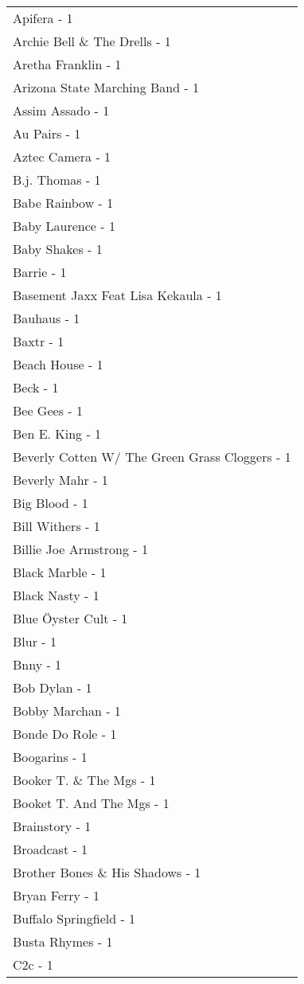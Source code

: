 \documentclass[
]{article}
\begin{document}
\begin{longtable}{l}
Apifera - 1 \\ 
Archie Bell \& The Drells - 1 \\ 
Aretha Franklin - 1 \\ 
Arizona State Marching Band - 1 \\ 
Assim Assado - 1 \\ 
Au Pairs - 1 \\ 
Aztec Camera - 1 \\ 
B.j. Thomas - 1 \\ 
Babe Rainbow - 1 \\ 
Baby Laurence - 1 \\ 
Baby Shakes - 1 \\ 
Barrie - 1 \\ 
Basement Jaxx Feat Lisa Kekaula - 1 \\ 
Bauhaus - 1 \\ 
Baxtr - 1 \\ 
Beach House - 1 \\ 
Beck - 1 \\ 
Bee Gees - 1 \\ 
Ben E. King - 1 \\ 
Beverly Cotten W/ The Green Grass Cloggers - 1 \\ 
Beverly Mahr - 1 \\ 
Big Blood - 1 \\ 
Bill Withers - 1 \\ 
Billie Joe Armstrong - 1 \\ 
Black Marble - 1 \\ 
Black Nasty - 1 \\ 
Blue Öyster Cult - 1 \\ 
Blur - 1 \\ 
Bnny - 1 \\ 
Bob Dylan - 1 \\ 
Bobby Marchan - 1 \\ 
Bonde Do Role - 1 \\ 
Boogarins - 1 \\ 
Booker T. \& The Mgs - 1 \\ 
Booket T. And The Mgs - 1 \\ 
Brainstory - 1 \\ 
Broadcast - 1 \\ 
Brother Bones \& His Shadows - 1 \\ 
Bryan Ferry - 1 \\ 
Buffalo Springfield - 1 \\ 
Busta Rhymes - 1 \\ 
C2c - 1 \\ 

\end{longtable}
\end{document}
